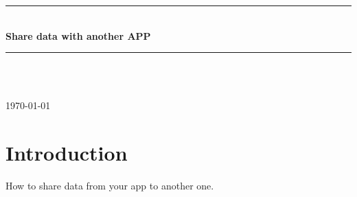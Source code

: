 \documentclass[12pt]{article} %
\begin{document}

\begin{titlepage}

\newcommand{\HRule}{\rule{\linewidth}{0.5mm}} %

\center %

\HRule \\[0.4cm]
{ \huge \bfseries Share data with another APP}\\[0.4cm] %
\HRule \\[1.5cm]

\begin{minipage}{0.4\textwidth}
\end{minipage}\\[4cm]

{\large \today}\\[3cm] %


\vfill %

\end{titlepage}


\tableofcontents %

\newpage %


\section{Introduction} %

How to share data from your app to another one.
\end{document}
